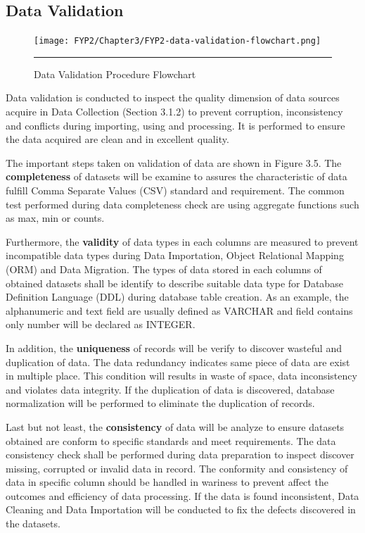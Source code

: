 \subsection{Data Validation}

\begin{figure}[H]
	\centering
	\texttt{[image: FYP2/Chapter3/FYP2-data-validation-flowchart.png]}
	\rule{35em}{0.7pt}
	\caption[Data Validation Procedure Flowchart]{Data Validation Procedure Flowchart}
\end{figure}

Data validation is conducted to inspect the quality dimension of data sources acquire in Data Collection (Section 3.1.2) to prevent corruption, inconsistency and conflicts during importing, using and processing. It is performed to ensure the data acquired are clean and in excellent quality. 

The important steps taken on validation of data are shown in Figure 3.5. The \textbf{completeness} of datasets will be examine to assures the characteristic of data fulfill Comma Separate Values (CSV) standard and requirement. The common test performed during data completeness check are using aggregate functions such as max, min or counts. \cite{data-completeness-check}

Furthermore, the \textbf{validity} of data types in each columns are measured to prevent incompatible data types during Data Importation, Object Relational Mapping (ORM) and Data Migration. The types of data stored in each columns of obtained datasets shall be identify to describe suitable data type for Database Definition Language (DDL) during database table creation. As an example, the alphanumeric and text field are usually defined as VARCHAR and field contains only number will be declared as INTEGER.  

In addition, the \textbf{uniqueness} of records will be verify to discover wasteful and duplication of data. The data redundancy indicates same piece of data are exist in multiple place. \cite{data-redundancy-definition} This condition will results in waste of space, data inconsistency and violates data integrity. If the duplication of data is discovered, database normalization will be performed to eliminate the duplication of records. 

Last but not least, the \textbf{consistency} of data will be analyze to ensure datasets obtained are conform to specific standards and meet requirements. The data consistency check shall be performed during data preparation to inspect discover missing, corrupted or invalid data in record. The conformity and consistency of data in specific column should be handled in wariness to prevent affect the outcomes and efficiency of data processing. If the data is found inconsistent, Data Cleaning and Data Importation will be conducted to fix the defects discovered in the datasets. 

